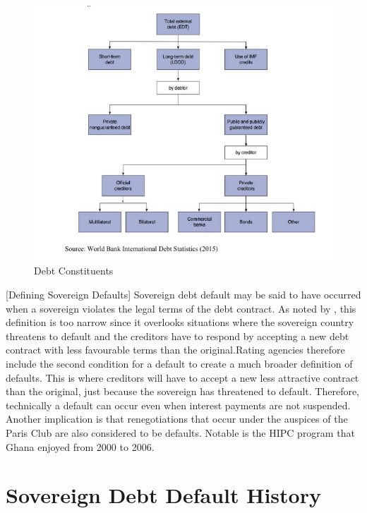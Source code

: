 \documentclass[14pt, a4paper]{article}
\begin{document}
	\begin{figure}[h]
		\centering
		\includegraphics*[width=1\textwidth]{Data/debt_constituents.png}
		\caption[Debt Constituents]{Debt Constituents}
		\label{fig:debtconstituents}
	\end{figure}

	[Defining Sovereign Defaults]
	Sovereign debt default may be said to have occurred when a sovereign violates the legal terms of the debt contract. As noted by , this definition is too narrow since it overlooks situations where the sovereign country threatens to default and the creditors have to respond by accepting a new debt contract with less favourable terms than the original.Rating agencies therefore include the second condition for a default to create a much broader definition of defaults. This is where creditors will have to accept a new less attractive contract than the original, just because the sovereign has threatened to default. Therefore, technically a default can occur even when interest payments are not suspended. Another implication is that renegotiations that occur under the auspices of the Paris Club are also considered to be defaults. Notable is the HIPC program that Ghana enjoyed from 2000 to 2006.\cite{beers2007default} %
	
	\section{Sovereign Debt Default History}
	
\end{document}
